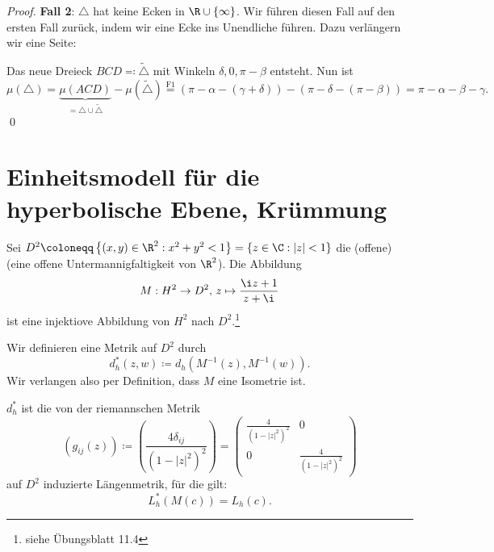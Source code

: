 \begin{remark}
\begin{enumerate}
\begin{proof}
      \textbf{Fall 2}: \( \triangle \) hat keine Ecken in \( \R \cup \left \{ \infty \right \} \). Wir führen diesen Fall auf den ersten Fall zurück, indem wir eine Ecke ins Unendliche führen. Dazu verlängern wir eine Seite:


      Das neue Dreieck \( BCD \eqqcolon \widetilde{\triangle} \) mit Winkeln \( \delta, 0, \pi - \beta \) entsteht. Nun ist
      \begin{equation*}
        \mu(\triangle) = \underbrace{\mu(ACD)}_{= \triangle \cup \widetilde{\triangle}} - \mu(\widetilde{\triangle}) \overset{\text{F1}}{=} \left( \pi - \alpha - (\gamma + \delta) \right) - \left( \pi - \delta - (\pi - \beta) \right) = \pi - \alpha - \beta - \gamma\text{.}
      \end{equation*} \qed
    \end{proof}
  \end{enumerate}
\end{remark}

\section{Einheitsmodell für die hyperbolische Ebene, Krümmung}

Sei \( D^2 \coloneqq \left \{ (x,y) \in \R^2 : x^2 + y^2 < 1 \right \} = \left \{ z \in \C : \left\vert z \right\vert < 1 \right \} \) die (offene)  (eine offene Untermannigfaltigkeit von \( \R^2 \)). Die Abbildung
\begin{equation*}
  M : H^2 \to D^2\text{,} \ z \mapsto \frac{\i z + 1}{z + \i}
\end{equation*}
ist eine injektiove Abbildung von \( H^2 \) nach \( D^2 \).\footnote{siehe Übungsblatt 11.4}

Wir definieren eine Metrik auf \( D^2 \) durch
\begin{equation*}
  d_h^\ast(z,w) \coloneqq d_h\left( M^{-1}(z),M^{-1}(w) \right)\text{.}
\end{equation*}
Wir verlangen also per Definition, dass \( M \) eine Isometrie ist.

\begin{remark}
  \( d_h^\ast \) ist die von der riemannschen Metrik
  \begin{equation*}
    \left( g_{ij}(z) \right) \coloneqq \left( \frac{4\delta_{ij}}{\left( 1-\left\vert z \right\vert^2 \right)^2} \right) = \begin{pmatrix}
      \frac{4}{\left( 1-\left\vert z \right\vert^2 \right)^2} & 0 \\
      0 & \frac{4}{\left( 1-\left\vert z \right\vert^2 \right)^2}
    \end{pmatrix}
  \end{equation*}
  auf \( D^2 \) induzierte Längenmetrik, für die gilt:
  \begin{equation*}
    L_h^\ast(M(c)) = L_h(c)\text{.}
  \end{equation*}
\end{remark}